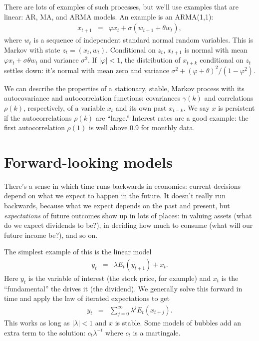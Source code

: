 \documentclass[11pt]{article}
\begin{document}
There are lots of examples of such processes, but we'll use
examples that are linear:  AR, MA, and ARMA models.
An example is an ARMA(1,1):
\begin{eqnarray*}
    x_{t+1} &=& \varphi x_{t} + \sigma ( w_{t+1} + \theta w_t ) ,
\end{eqnarray*}
where $ w_t$ is a sequence of independent standard normal random variables.
This is Markov with state $z_t = (x_t,w_t)$.
Conditional on $z_t$, $x_{t+1}$ is normal with mean $\varphi x_t + \sigma\theta w_t$
and variance $\sigma^2$.
If $| \varphi | < 1$,
the distribution of $x_{t+k}$ conditional on $z_t$ settles down:
it's normal with mean zero and variance $ \sigma^2 + (\varphi+\theta)^2/(1-\varphi^2) $.

We can describe the properties of a stationary, stable, Markov process
with its autocovariance and autocorrelation functions:
covariances $\gamma(k)$ and correlations $\rho(k)$, respectively,
of a variable $x_t$ and its own past $x_{t-k} $.
We say $x$ is persistent if the autocorrelations $\rho(k)$ are ``large.''
Interest rates are a good example:
the first autocorrelation $\rho(1)$ is well above 0.9 for monthly data.



\section{Forward-looking models}

There's a sense in which time runs backwards in economics:
current decisions depend on what we expect to happen in the future.
It doesn't really run backwards, because what we expect depends on the past and present,
but {\it expectations\/} of future outcomes show up in lots of places:
in valuing assets (what do we expect dividends to be?),
in deciding how much to consume (what will our future income be?),
and so on.

The simplest example of this is the linear model
\begin{eqnarray*}
    y_t &=& \lambda E_t (y_{t+1}) + x_t .
\end{eqnarray*}
Here $y_t$ is the variable of interest (the stock price, for example)
and $x_t$ is the ``fundamental'' the drives it (the dividend).
We generally solve this forward in time and apply the law of iterated
expectations to get
\begin{eqnarray*}
    y_t &=& \sum_{j=0}^\infty \lambda^j E_t (x_{t+j}) .
\end{eqnarray*}
This works as long as $|\lambda | < 1$ and $x$ is stable.
Some models of bubbles add an extra term to the solution:
$ c_t \lambda^{-t}$ where $ c_t$ is a martingale.
\end{document}
